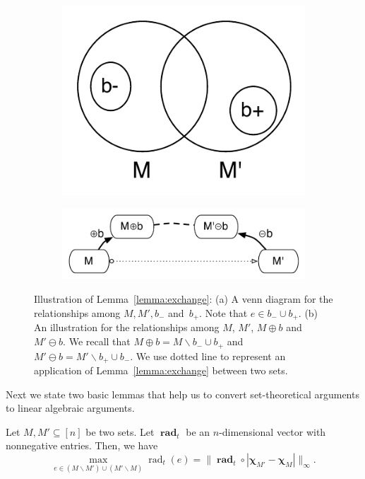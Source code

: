 \documentclass{article}
\newcommand{\del}{\backslash}
\DeclareMathOperator{\rad}{rad}
\renewcommand{\vec}[1]{\boldsymbol{#1}}
\renewcommand{\odot}{\circ}
\begin{document}
\begin{figure}[t]
\centering
\begin{subfigure}[b]{0.23\textwidth}
	\includegraphics[width=\textwidth]{fig/interpolate-venn}
	\caption{}
\end{subfigure}
\hspace{3em}
\begin{subfigure}[b]{0.54\textwidth}
	\includegraphics[width=\textwidth]{fig/interpolate-basic}
	\caption{}
\end{subfigure}
\caption{Illustration of Lemma~\ref{lemma:exchange}: (a) A venn diagram for the relationships among $M,M',b_-$ and~$b_+$. Note that $e\in b_-\cup b_+$. (b) An illustration for the relationships among $M$, $M'$, $M\oplus b$ and $M'\ominus b$.
We recall that $M\oplus b = M\del b_-\cup b_+$ and $M'\ominus b = M' \del b_+ \cup b_-$. We use dotted line to represent an application of Lemma~\ref{lemma:exchange} between two sets.}
\label{fig:zzz}
\end{figure}


Next we state two basic lemmas that help us to convert set-theoretical arguments to linear algebraic arguments.
\begin{lemma}
\label{lemma:max}
Let $M, M' \subseteq [n]$ be two sets. Let $\vec \rad_t$ be an $n$-dimensional vector with nonnegative entries.
Then, we have 
$$ \max_{e \in (M\del M') \cup (M'\del M)} \rad_t(e) = \big\|\vec \rad_t \odot |\vec \chi_{M'} - \vec \chi_M| \big\|_\infty.$$
\end{lemma}
\end{document}
